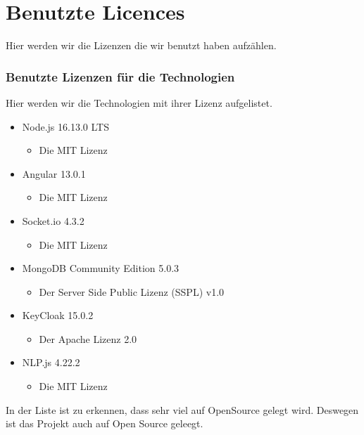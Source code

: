 \section{Benutzte Licences}
Hier werden wir die Lizenzen die wir benutzt haben aufzählen.

\subsubsection{Benutzte Lizenzen für die Technologien}
Hier werden wir die Technologien mit ihrer Lizenz aufgelistet.

\begin{itemize}
    \item Node.js 16.13.0 LTS 
    \begin{itemize}
        \item Die MIT Lizenz
    \end{itemize}
    \item Angular 13.0.1
    \begin{itemize}
        \item Die MIT Lizenz
    \end{itemize}
    \item Socket.io 4.3.2
    \begin{itemize}
        \item Die MIT Lizenz
    \end{itemize}
    \item MongoDB Community Edition 5.0.3
    \begin{itemize}
        \item Der Server Side Public Lizenz (SSPL) v1.0
    \end{itemize}
    \item KeyCloak 15.0.2
    \begin{itemize}
        \item Der Apache Lizenz 2.0
    \end{itemize}
    \item NLP.js 4.22.2
    \begin{itemize}
        \item Die MIT Lizenz
    \end{itemize}
\end{itemize}

\noindent In der Liste ist zu erkennen, dass sehr viel auf OpenSource gelegt wird.
Deswegen ist das Projekt auch auf Open Source geleegt.